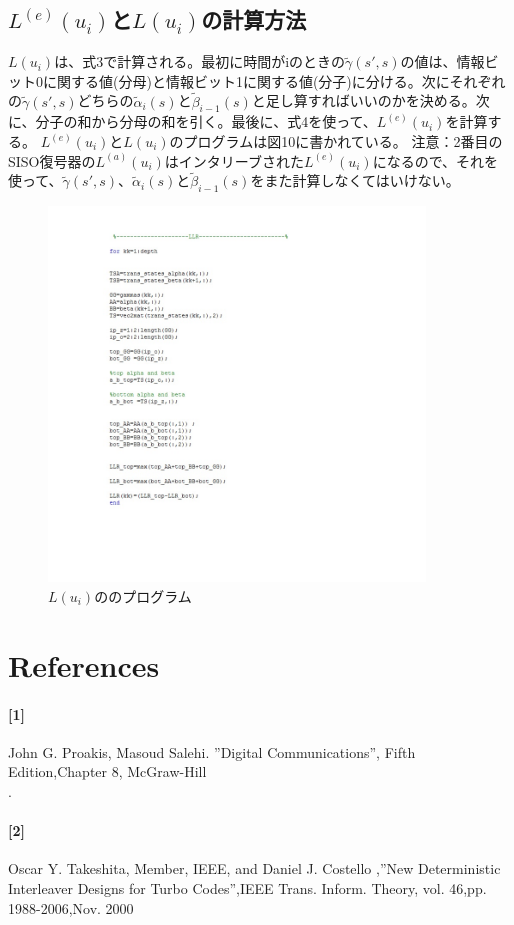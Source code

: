 \documentclass[20 pts]{article}
\begin{document}
\subsection{$L^{(e)}(u_i)$と$L(u_i)$の計算方法}
$L(u_i)$は、式3で計算される。最初に時間がiのときの$\widetilde{\gamma}(s',s)$の値は、情報ビット0に関する値(分母)と情報ビット1に関する値(分子)に分ける。次にそれぞれの$\widetilde{\gamma}(s',s)$どちらの$\widetilde{\alpha}_i(s)$と$\widetilde{\beta}_{i-1}(s)$と足し算すればいいのかを決める。次に、分子の和から分母の和を引く。最後に、式4を使って、$L^{(e)}(u_i)$を計算する。
$L^{(e)}(u_i)$と$L(u_i)$のプログラムは図10に書かれている。
注意：2番目のSISO復号器の$L^{(a)}(u_i)$はインタリーブされた$L^{(e)}(u_i)$になるので、それを使って、$\widetilde{\gamma}(s',s)$、$\widetilde{\alpha}_i(s)$と$\widetilde{\beta}_{i-1}(s)$をまた計算しなくてはいけない。
\begin{figure}[h!]
\includegraphics[width=10cm]{zu10.jpg}
\caption{ $L(u_i)$ののプログラム}
\label{図2}
\end{figure}

\newpage
\section{References}
\paragraph{[1]}   John G. Proakis, Masoud Salehi. ''Digital Communications'', Fifth Edition,Chapter 8, McGraw-Hill\\.
\paragraph{[2]}  Oscar Y. Takeshita, Member, IEEE, and Daniel J. Costello ,''New Deterministic Interleaver Designs for Turbo Codes'',IEEE Trans. Inform. Theory, vol.  46,pp. 1988-2006,Nov. 2000\\
\end{document}
